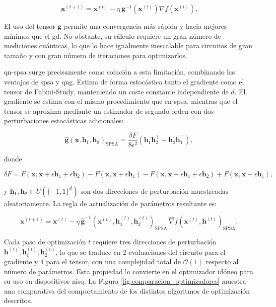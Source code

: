 \[
  \mathbf{x}^{(t+1)} = \mathbf{x}^{(t)} - \eta\, \mathbf{g}^{-1}(\mathbf{x}^{(t)}) \nabla f(\mathbf{x}^{(t)}).
\]

El uso del tensor $\mathbf{g}$ permite una convergencia más rápida y hacia mejores mínimos que el \gls{gd}. No obstante, su cálculo requiere un gran número de mediciones cuánticas, lo que lo hace igualmente inescalable para circuitos de gran tamaño y con gran número de iteraciones para optimizarlos.

\gls{qn-spsa} surge precisamente como solución a esta limitación, combinando las ventajas de \gls{spsa} y \gls{qng}. Estima de forma estocástica tanto el gradiente como el tensor de Fubini-Study, manteniendo un coste constante independiente de $d$. El gradiente se estima con el mismo procedimiento que en \gls{spsa}, mientras que el tensor se aproxima mediante un estimador de segundo orden con dos perturbaciones estocásticas adicionales:

\[
  \widehat{\mathbf{g}}(\mathbf{x}, \mathbf{h}_1, \mathbf{h}_2)_{\text{SPSA}} = \frac{\delta F}{8\epsilon^2} \left( \mathbf{h}_1 \mathbf{h}_2^\top + \mathbf{h}_2 \mathbf{h}_1^\top \right),
\]

donde

\[
  \delta F = F(\mathbf{x}, \mathbf{x} + \epsilon \mathbf{h}_1 + \epsilon \mathbf{h}_2) - F(\mathbf{x}, \mathbf{x} + \epsilon \mathbf{h}_1) - F(\mathbf{x}, \mathbf{x} - \epsilon \mathbf{h}_1 + \epsilon \mathbf{h}_2) + F(\mathbf{x}, \mathbf{x} - \epsilon \mathbf{h}_1),
\]

y $\mathbf{h}_1, \mathbf{h}_2 \in U(\{-1, 1\}^d)$ son dos direcciones de perturbación muestreadas aleatoriamente. La regla de actualización de parámetros resultante es:

\[
  \mathbf{x}^{(t+1)} = \mathbf{x}^{(t)} - \eta\, \widehat{\mathbf{g}}^{-1}(\mathbf{x}^{(t)}, \mathbf{h}_1^{(t)}, \mathbf{h}_2^{(t)})_{\text{SPSA}}\, \widehat{\nabla} f(\mathbf{x}^{(t)}, \mathbf{h}^{(t)})_{\text{SPSA}}.
\]

Cada paso de optimización $t$ requiere tres direcciones de perturbación $\mathbf{h}^{(t)}, \mathbf{h}_1^{(t)}, \mathbf{h}_2^{(t)}$, lo que se traduce en 2 evaluaciones del circuito para el gradiente y 4 para el tensor, con una complejidad total de $\mathcal{O}(1)$ respecto al número de parámetros. Esta propiedad lo convierte en el optimizador idóneo para su uso en dispositivos \gls{nisq}. La Figura \ref{fig:comparacion_optimizadores} muestra una comparativa del comportamiento de los distintos algoritmos de optimización descritos.

